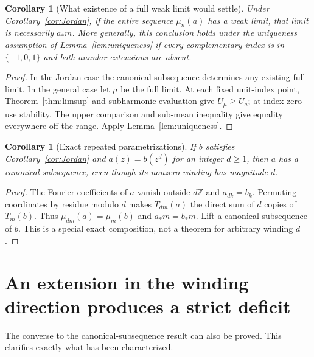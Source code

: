 \documentclass[11pt]{article}
\newtheorem{corollary}[theorem]{Corollary}
\theoremstyle{definition}
\begin{document}
\begin{corollary}[What existence of a full weak limit would settle]\label{cor:existinglimit}
Under Corollary~\ref{cor:Jordan}, if the entire sequence $\mu_n(a)$ has a weak limit, that limit is necessarily $a_*m$. More generally, this conclusion holds under the uniqueness assumption of Lemma~\ref{lem:uniqueness} if every complementary index is in $\{-1,0,1\}$ and both annular extensions are absent.
\end{corollary}
\begin{proof}
In the Jordan case the canonical subsequence determines any existing full limit. In the general case let $\mu$ be the full limit. At each fixed unit-index point, Theorem~\ref{thm:limsup} and subharmonic evaluation give $U_\mu\ge U_a$; at index zero use stability. The upper comparison and sub-mean inequality give equality everywhere off the range. Apply Lemma~\ref{lem:uniqueness}.
\end{proof}

\begin{corollary}[Exact repeated parametrizations]\label{cor:powerparam}
If $b$ satisfies Corollary~\ref{cor:Jordan} and $a(z)=b(z^d)$ for an integer $d\ge1$, then $a$ has a canonical subsequence, even though its nonzero winding has magnitude $d$.
\end{corollary}
\begin{proof}
The Fourier coefficients of $a$ vanish outside $d\mathbb Z$ and $a_{dk}=b_k$. Permuting coordinates by residue modulo $d$ makes $T_{dm}(a)$ the direct sum of $d$ copies of $T_m(b)$. Thus $\mu_{dm}(a)=\mu_m(b)$ and $a_*m=b_*m$. Lift a canonical subsequence of $b$. This is a special exact composition, not a theorem for arbitrary winding $d$.
\end{proof}

\section{An extension in the winding direction produces a strict deficit}
The converse to the canonical-subsequence result can also be proved. This clarifies exactly what has been characterized.
\end{document}
